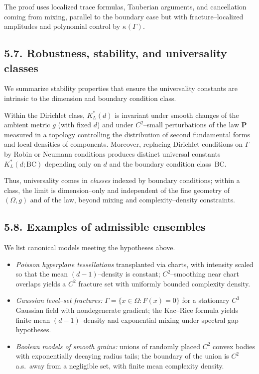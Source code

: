 \noindent
The proof uses localized trace formulas, Tauberian arguments, and cancellation coming from mixing, parallel to the boundary case but with fracture–localized amplitudes and polynomial control by $\kappa(\Gamma)$.

\subsection*{5.7. Robustness, stability, and universality classes}
We summarize stability properties that ensure the universality constants are intrinsic to the dimension and boundary condition class.

\begin{proposition}[Stability]\label{prop:stability}
Within the Dirichlet class, $K^*_L(d)$ is invariant under smooth changes of the ambient metric $g$ (with fixed $d$) and under $C^2$–small perturbations of the law $\mathbf{P}$ measured in a topology controlling the distribution of second fundamental forms and local densities of components. Moreover, replacing Dirichlet conditions on $\Gamma$ by Robin or Neumann conditions produces distinct universal constants $K^*_L(d;\mathrm{BC})$ depending only on $d$ and the boundary condition class~$\mathrm{BC}$.
\end{proposition}

\noindent
Thus, universality comes in \emph{classes} indexed by boundary conditions; within a class, the limit is dimension–only and independent of the fine geometry of $(\Omega,g)$ and of the law, beyond mixing and complexity–density constraints.

\subsection*{5.8. Examples of admissible ensembles}
We list canonical models meeting the hypotheses above.

\begin{itemize}
\item \emph{Poisson hyperplane tessellations} transplanted via charts, with intensity scaled so that the mean $(d\!-\!1)$–density is constant; $C^2$–smoothing near chart overlaps yields a $C^2$ fracture set with uniformly bounded complexity density.
\item \emph{Gaussian level–set fractures:} $\Gamma=\{x\in\Omega: F(x)=0\}$ for a stationary $C^3$ Gaussian field with nondegenerate gradient; the Kac–Rice formula yields finite mean $(d\!-\!1)$–density and exponential mixing under spectral gap hypotheses.
\item \emph{Boolean models of smooth grains:} unions of randomly placed $C^2$ convex bodies with exponentially decaying radius tails; the boundary of the union is $C^2$ a.s.\ away from a negligible set, with finite mean complexity density.
\end{itemize}

